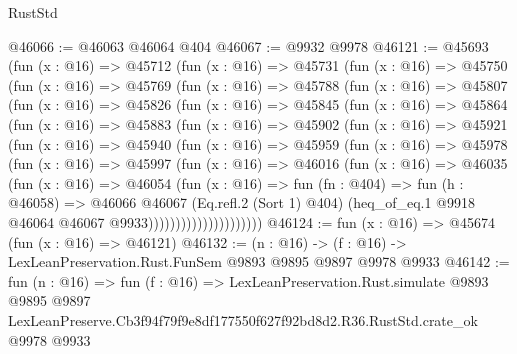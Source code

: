 \begin{lexlean}{RustStd}
\begin{coremodule}
@46066 := @46063 @46064 @404
@46067 := @9932 @9978
@46121 := @45693
    (fun (x : @16) =>
    @45712
      (fun (x : @16) =>
      @45731
        (fun (x : @16) =>
        @45750
          (fun (x : @16) =>
          @45769
            (fun (x : @16) =>
            @45788
              (fun (x : @16) =>
              @45807
                (fun (x : @16) =>
                @45826
                  (fun (x : @16) =>
                  @45845
                    (fun (x : @16) =>
                    @45864
                      (fun (x : @16) =>
                      @45883
                        (fun (x : @16) =>
                        @45902
                          (fun (x : @16) =>
                          @45921
                            (fun (x : @16) =>
                            @45940
                              (fun (x : @16) =>
                              @45959
                                (fun (x : @16) =>
                                @45978
                                  (fun (x : @16) =>
                                  @45997
                                    (fun (x : @16) =>
                                    @46016
                                      (fun (x : @16) =>
                                      @46035
                                        (fun (x : @16) =>
                                        @46054
                                          (fun (x : @16) =>
                                          fun (fn : @404) =>
                                          fun (h : @46058) =>
                                          @46066
                                            @46067
                                            (Eq.refl.{2} (Sort 1) @404)
                                            (heq_of_eq.{1}
                                              @9918
                                              @46064
                                              @46067
                                              @9933)))))))))))))))))))))
@46124 := fun (x : @16) => @45674 (fun (x : @16) => @46121)
@46132 := (n : @16) -> (f : @16) -> LexLeanPreservation.Rust.FunSem @9893 @9895 @9897 @9978 @9933
@46142 := fun (n : @16) =>
  fun (f : @16) =>
  LexLeanPreservation.Rust.simulate
    @9893
    @9895
    @9897
    LexLeanPreserve.Cb3f94f79f9e8df177550f627f92bd8d2.R36.RustStd.crate_ok
    @9978
    @9933
\end{coremodule}
\end{lexlean}
